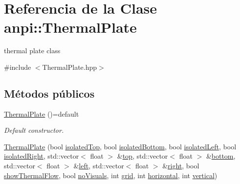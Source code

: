 \hypertarget{classanpi_1_1ThermalPlate}{}\section{Referencia de la Clase anpi\+:\+:Thermal\+Plate}
\label{classanpi_1_1ThermalPlate}


thermal plate class  




{\ttfamily \#include $<$Thermal\+Plate.\+hpp$>$}

\subsection*{Métodos públicos}
\begin{DoxyCompactItemize}
\item 
\hyperlink{classanpi_1_1ThermalPlate_a39bd162b401db270c8c304efc5bb98c1}{Thermal\+Plate} ()=default
\begin{DoxyCompactList}\small\item\em Default constructor. \end{DoxyCompactList}\item 
\hyperlink{classanpi_1_1ThermalPlate_ac48332c6a6deef37d73a60a1cf6fe3b7}{Thermal\+Plate} (bool \hyperlink{classanpi_1_1ThermalPlate_ac592cd574059aedf1eb2cb27e626b51a}{isolated\+Top}, bool \hyperlink{classanpi_1_1ThermalPlate_af4a6a4bdaecee9a414226d08a9ef1a72}{isolated\+Bottom}, bool \hyperlink{classanpi_1_1ThermalPlate_adbf8ddb9cecdf113e73107400836faf5}{isolated\+Left}, bool \hyperlink{classanpi_1_1ThermalPlate_ace940ae1c50cc8dfff9f2e715a7646b5}{isolated\+Right}, std\+::vector$<$ float $>$ \&\hyperlink{classanpi_1_1ThermalPlate_af33d6fdc473b7c702a170219add449f0}{top}, std\+::vector$<$ float $>$ \&\hyperlink{classanpi_1_1ThermalPlate_a0ab76c4f095790d763aa7d1eadbde70c}{bottom}, std\+::vector$<$ float $>$ \&\hyperlink{classanpi_1_1ThermalPlate_ab0a7fdc0fa86b01ea917291940de2c5e}{left}, std\+::vector$<$ float $>$ \&\hyperlink{classanpi_1_1ThermalPlate_acc521430da00ad61b016ddb4300462d3}{right}, bool \hyperlink{classanpi_1_1ThermalPlate_a71037bf9aaa9f0ea7098a0ff635a186e}{show\+Thermal\+Flow}, bool \hyperlink{classanpi_1_1ThermalPlate_a1730343425724196f24a3340487f078d}{no\+Visuals}, int \hyperlink{classanpi_1_1ThermalPlate_a09c6cb5df28bbc7ce19b0361ffdd20f3}{grid}, int \hyperlink{classanpi_1_1ThermalPlate_a915dd59f0f630a5e2c1bd46bc129ec6d}{horizontal}, int \hyperlink{classanpi_1_1ThermalPlate_a852ee99fadbce99f511a372c47c2d3ee}{vertical})
\item 

\end{DoxyCompactItemize}
